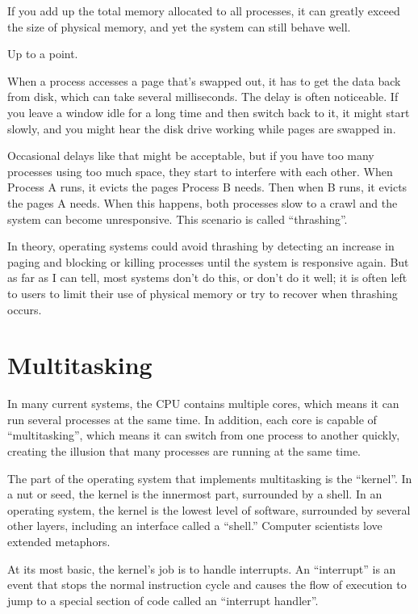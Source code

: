 \documentclass[12pt]{book}
\begin{document}
{\begin{itemize}
\end{itemize}

If you add up the total memory allocated to all processes, it can
greatly exceed the size of physical memory, and yet the system can
still behave well.

Up to a point.

When a process accesses a page that's swapped out, it has to get the
data back from disk, which can take several milliseconds.  The
delay is often noticeable.  If you leave a window idle for a long
time and then switch back to it, it might start slowly,
and you might hear the disk drive working while pages are
swapped in.  

Occasional delays like that might be acceptable, but if you have too
many processes using too much space, they start to interfere with each
other.  When Process A runs, it evicts the pages Process B needs.
Then when B runs, it evicts the pages A needs.  When this happens,
both processes slow to a crawl and the system can become unresponsive.
This scenario is called ``thrashing''.

In theory, operating systems could avoid thrashing by detecting an
increase in paging and blocking or killing processes until the system
is responsive again.  But as far as I can tell, most systems don't do
this, or don't do it well; it is often left to users to limit their
use of physical memory or try to recover when thrashing occurs.


\chapter{Multitasking}

In many current systems, the CPU contains multiple cores, which means
it can run several processes at the same time.  In addition, each core
is capable of ``multitasking'', which means it can switch from one
process to another quickly, creating the illusion that many processes
are running at the same time.

The part of the operating system that implements multitasking is
the ``kernel''.  In a nut or seed, the kernel is the innermost
part, surrounded by a shell.  In an operating system, the kernel
is the lowest level of software, surrounded by several other
layers, including an interface called a ``shell.''  Computer
scientists love extended metaphors.

At its most basic, the kernel's job is to
handle interrupts.  An ``interrupt'' is an event that stops the
normal instruction cycle and causes the flow of execution to jump to a
special section of code called an ``interrupt handler''.

}
\end{document}
